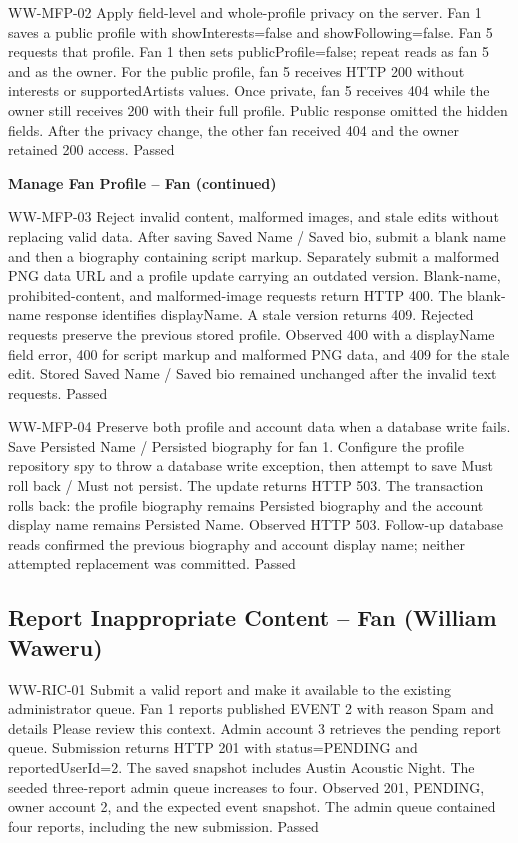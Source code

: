 \documentclass[11pt]{report}
\begin{document}
\williamtestcase
{WW-MFP-02}
{Apply field-level and whole-profile privacy on the server.}
{Fan 1 saves a public profile with showInterests=false and showFollowing=false. Fan 5 requests that profile. Fan 1 then sets publicProfile=false; repeat reads as fan 5 and as the owner.}
{For the public profile, fan 5 receives HTTP 200 without interests or supportedArtists values. Once private, fan 5 receives 404 while the owner still receives 200 with their full profile.}
{Public response omitted the hidden fields. After the privacy change, the other fan received 404 and the owner retained 200 access.}
{Passed}

\clearpage
\noindent\textbf{Manage Fan Profile -- Fan (continued)}\par
\williamtestcase
{WW-MFP-03}
{Reject invalid content, malformed images, and stale edits without replacing valid data.}
{After saving Saved Name / Saved bio, submit a blank name and then a biography containing script markup. Separately submit a malformed PNG data URL and a profile update carrying an outdated version.}
{Blank-name, prohibited-content, and malformed-image requests return HTTP 400. The blank-name response identifies displayName. A stale version returns 409. Rejected requests preserve the previous stored profile.}
{Observed 400 with a displayName field error, 400 for script markup and malformed PNG data, and 409 for the stale edit. Stored Saved Name / Saved bio remained unchanged after the invalid text requests.}
{Passed}

\williamtestcase
{WW-MFP-04}
{Preserve both profile and account data when a database write fails.}
{Save Persisted Name / Persisted biography for fan 1. Configure the profile repository spy to throw a database write exception, then attempt to save Must roll back / Must not persist.}
{The update returns HTTP 503. The transaction rolls back: the profile biography remains Persisted biography and the account display name remains Persisted Name.}
{Observed HTTP 503. Follow-up database reads confirmed the previous biography and account display name; neither attempted replacement was committed.}
{Passed}

\clearpage
\subsection*{Report Inappropriate Content -- Fan (William Waweru)}
\williamtestcase
{WW-RIC-01}
{Submit a valid report and make it available to the existing administrator queue.}
{Fan 1 reports published EVENT 2 with reason Spam and details Please review this context. Admin account 3 retrieves the pending report queue.}
{Submission returns HTTP 201 with status=PENDING and reportedUserId=2. The saved snapshot includes Austin Acoustic Night. The seeded three-report admin queue increases to four.}
{Observed 201, PENDING, owner account 2, and the expected event snapshot. The admin queue contained four reports, including the new submission.}
{Passed}
\end{document}
